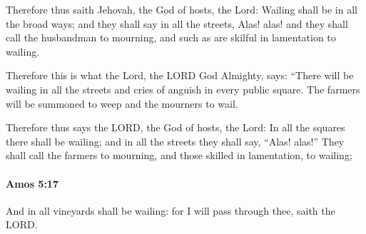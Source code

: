 			\begin{versebox}
					\item[BHS] 
					\item[LXX] 
					\item[ASV] Therefore thus saith Jehovah, the God of hosts, the Lord: Wailing shall be in all the broad ways; and they shall say in all the streets, Alas! alas! and they shall call the husbandman to mourning, and such as are skilful in lamentation to wailing.
					\item[NIV] Therefore this is what the Lord, the LORD God Almighty, says: “There will be wailing in all the streets and cries of anguish in every public square. The farmers will be summoned to weep and the mourners to wail.
					\item[NRSV] Therefore thus says the LORD, the God of hosts, the Lord: In all the squares there shall be wailing; and in all the streets they shall say, “Alas! alas!” They shall call the farmers to mourning, and those skilled in lamentation, to wailing;
			\end{versebox}

		\paragraph{Amos 5:17} %
			\label{AMOS-5-17}

			And in all vineyards shall be wailing: for I will pass through thee, saith the LORD.

